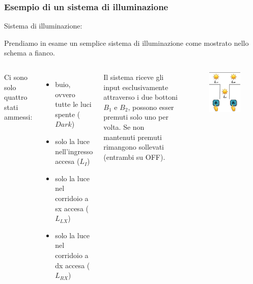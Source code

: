 \begin{frame}
	\frametitle{Esempio di un sistema di illuminazione}
	\begin{block}{Sistema di illuminazione:}
	
	Prendiamo in esame un semplice sistema di illuminazione come mostrato nello schema a fianco.
	\hspace{0.3em}
	
	\begin{columns}			
		
		Ci sono solo quattro stati ammessi: 
		\begin{itemize}
			\item buio, ovvero tutte le luci spente ($Dark$)
			\item solo la luce nell'ingresso accesa ($L_I$)
			\item solo la luce nel corridoio a sx accesa ($L_{LX}$)
			\item solo la luce nel corridoio a dx accesa ($L_{RX}$)
		\end{itemize}
		
		Il sistema riceve gli input esclusivamente attraverso i due bottoni $B_1$ e $B_2$, possono esser premuti solo uno per volta.
		Se non mantenuti premuti rimangono sollevati (entrambi su OFF).
					
		\begin{figure}[!htbp]
			\centering 
			\includegraphics[width=0.8\linewidth]{images/1_i_sistemi/sistemaLight.pdf}
		\end{figure}
		
	\end{columns}
	\end{block}
\end{frame}



